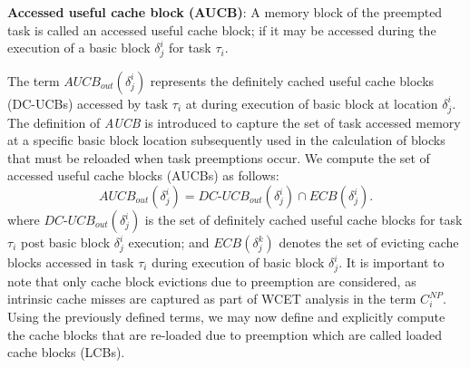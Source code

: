 \begin{definition}
\textbf{Accessed useful cache block (AUCB)}: A memory block of the preempted task is called an accessed useful cache block; if it may be accessed during the execution of a basic block \begin{math}\delta_{j}^{i}\end{math} for task \begin{math}\tau_{i}\end{math}.
\end{definition}

\noindent The term \begin{math}\textit{AUCB}_{out}(\delta_{j}^{i})\end{math} represents the definitely cached useful cache blocks (DC-UCBs) accessed by task \begin{math}\tau_{i}\end{math} at during execution of basic block at location \begin{math}\delta_{j}^{i}\end{math}. The definition of \textit{AUCB} is introduced to capture the set of task accessed memory at a specific basic block location subsequently used in the calculation of blocks that must be reloaded when task preemptions occur.  We compute the set of accessed useful cache blocks (AUCBs) as follows:
\begin{equation}\label{eqn:aucb-formula}
    \textit{AUCB}_{out}(\delta_{j}^{i}) = \textit{DC-UCB}_{out}(\delta_{j}^{i}) \cap \textit{ECB}(\delta_{j}^{i}).
\end{equation}
\noindent where \begin{math}\textit{DC-UCB}_{out}(\delta_{j}^{i})\end{math} is the set of definitely cached useful cache blocks for task \begin{math}\tau_{i}\end{math} post basic block \begin{math}\delta_{j}^{i}\end{math} execution; and \begin{math}\textit{ECB}(\delta_{j}^{k})\end{math} denotes the set of evicting cache blocks accessed in task \begin{math}\tau_{i}\end{math} during execution of basic block \begin{math}\delta_{j}^{i}\end{math}. It is important to note that only cache block evictions due to preemption are considered, as intrinsic cache misses are captured as part of WCET analysis in the term \begin{math}C_{i}^{NP}\end{math}.  Using the previously defined terms, we may now define and explicitly compute the cache blocks that are re-loaded due to preemption which are called loaded cache blocks (LCBs).

